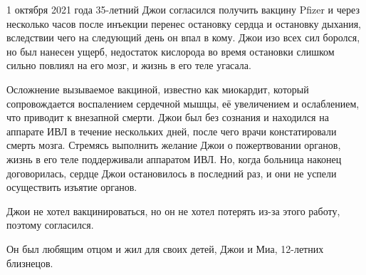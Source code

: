 1 октября 2021 года 35-летний Джои согласился получить вакцину Pfizer и через
несколько часов после инъекции перенес остановку сердца и остановку дыхания,
вследствии чего на следующий день он впал в кому. Джои изо всех сил боролся, но
был нанесен ущерб, недостаток кислорода во время остановки слишком сильно
повлиял на его мозг, и жизнь в его теле угасала.

Осложнение вызываемое вакциной, известно как миокардит, который сопровождается
воспалением сердечной мышцы, её увеличением и ослаблением, что приводит к
внезапной смерти.
Джои был без сознания и находился на аппарате ИВЛ в течение нескольких дней,
после чего врачи констатировали смерть мозга. Стремясь выполнить желание Джои о
пожертвовании органов, жизнь в его теле поддерживали аппаратом ИВЛ. Но, когда
больница наконец договорилась, сердце Джои остановилось в последний раз, и они
не успели осуществить изъятие органов.

Джои не хотел вакцинироваться, но он не хотел потерять из-за этого работу,
поэтому согласился.

Он был любящим отцом и жил для своих детей, Джои и Миа, 12-летних близнецов.

